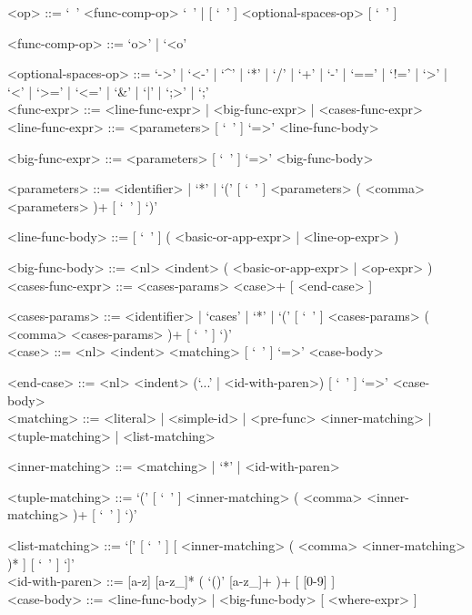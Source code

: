 \documentclass{article}
\begin{document}
\begin{grammar}
<op> ::= `\ ' <func-comp-op> `\ ' | [ `\ ' ] <optional-spaces-op> [ `\ ' ]

<func-comp-op> ::= `o>' | `<o'

<optional-spaces-op> ::= 
`->' | `<-' | `^' | `*' | `/' | `+' | `-' | `==' | `!=' | `>' | `<' | `>=' |
`<=' | `\&' | `|' | `;>' | `;'
\\

\newpage
<func-expr> ::= <line-func-expr> | <big-func-expr> | <cases-func-expr>
\\

<line-func-expr> ::= <parameters> [ `\ ' ] `=>' <line-func-body>

<big-func-expr> ::= <parameters> [ `\ ' ] `=>' <big-func-body>

<parameters> ::=
<identifier> | `*' |
`(' [ `\ ' ] <parameters> ( <comma> <parameters> )+ [ `\ ' ] `)'

<line-func-body> ::= [ `\ ' ] ( <basic-or-app-expr> | <line-op-expr> )

<big-func-body> ::= <nl> <indent> ( <basic-or-app-expr> | <op-expr> )
\\

<cases-func-expr> ::= <cases-params> <case>+ [ <end-case> ]

<cases-params> ::=
<identifier> | `cases' | `*' |
`(' [ `\ ' ] <cases-params> ( <comma> <cases-params> )+ [ `\ ' ] `)'
\\

<case> ::=  <nl> <indent> <matching> [ `\ ' ] `=>' <case-body>

<end-case> ::=
<nl> <indent> (`...' | <id-with-paren>) [ `\ ' ] `=>' <case-body>
\\

<matching> ::= 
<literal> | <simple-id> | <pre-func> <inner-matching> | <tuple-matching> |
<list-matching>

<inner-matching> ::= <matching> | `*' | <id-with-paren>

<tuple-matching> ::=
`(' [ `\ ' ] <inner-matching> ( <comma> <inner-matching> )+ [ `\ ' ] `)'

<list-matching> ::=
`[' [ `\ ' ] [ <inner-matching> ( <comma> <inner-matching> )* ] [ `\ ' ]
`]'
\\

<id-with-paren> ::= [a-z] [a-z_]* ( `()' [a-z_]+ )+ [ [0-9] ]
\\

<case-body> ::= <line-func-body> | <big-func-body> [ <where-expr> ]
\\


\end{grammar}
\end{document}
